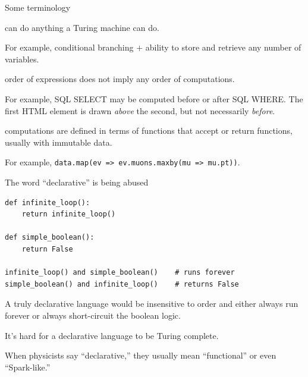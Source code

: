 \documentclass[aspectratio=169]{beamer}
\begin{document}
\begin{frame}{Some terminology}
\large
\vspace{0.5 cm}
\begin{description}\setlength{\itemsep}{0.5 cm}
\item[Turing complete:] can do anything a Turing machine can do.

\vspace{0.25 cm}
{\normalsize For example, conditional branching $+$ ability to store and retrieve any number of variables.}

\item[Declarative:] order of expressions does not imply any order of computations.

\vspace{0.25 cm}
{\normalsize For example, SQL SELECT may be computed before or after SQL WHERE. The first HTML element is drawn {\it above} the second, but not necessarily {\it before}.}

\item[Functional:] computations are defined in terms of functions that accept or return functions, usually with immutable data.

\vspace{0.25 cm}
{\normalsize For example, \small\texttt{data.map(ev => ev.muons.maxby(mu => mu.pt))}\normalsize .}
\end{description}
\end{frame}

\begin{frame}[fragile]{The word ``declarative'' is being abused}
\small
\vspace{0.25 cm}
\begin{center}
\begin{minipage}{0.8\linewidth}
\begin{verbatim}
def infinite_loop():
    return infinite_loop()

def simple_boolean():
    return False

infinite_loop() and simple_boolean()    # runs forever
simple_boolean() and infinite_loop()    # returns False
\end{verbatim}
\end{minipage}
\end{center}

\normalsize
\vspace{0.25 cm}
A truly declarative language would be insensitive to order and either always run forever or always short-circuit the boolean logic.

\vspace{0.5 cm}
It's hard for a declarative language to be Turing complete.

\vspace{0.5 cm}
When physicists say ``declarative,'' they usually mean ``functional'' or even ``Spark-like.''
\end{frame}
\end{document}
